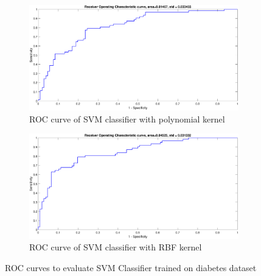 {\begin{figure}[!ht]
	\begin{subfigure}{.35\textwidth}
		\centering
		\captionsetup{width=0.8\linewidth}
		\includegraphics[height=.65\linewidth, width=0.9\linewidth]{Exercise1/Report/diabetes/dia_poly_ROC.eps}
		\caption{ROC curve of SVM classifier with polynomial kernel}
		\label{fig:dia_poly_ROC}
	\end{subfigure}%
	\begin{subfigure}{.35\textwidth}
		\centering
		\captionsetup{width=0.8\linewidth}
		\includegraphics[height=.65\linewidth, width=0.9\linewidth]{Exercise1/Report/diabetes/dia_RBF_ROC.eps}
		\caption{ROC curve of SVM classifier with RBF kernel} 
		\label{fig:dia_RBF_ROC}
	\end{subfigure}
	\caption{ROC curves to evaluate SVM Classifier trained on diabetes dataset}
	\label{fig:dia_ROC}
\end{figure}
 \begin{figure}[!ht]
	\begin{floatrow}

\end{floatrow}
\end{figure}}
